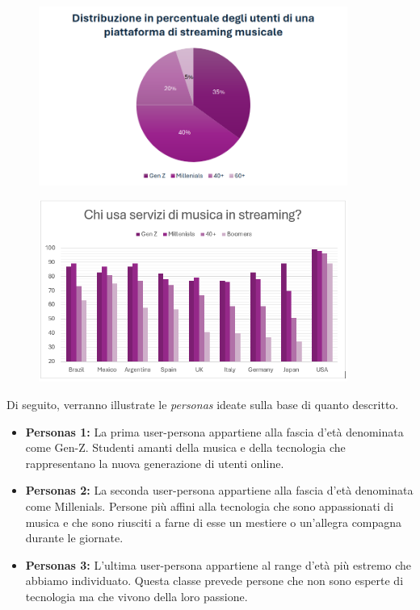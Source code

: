 \documentclass{article}
\begin{document}
			\begin{center}
				\begin{figure}[H]
					\centering
					\includegraphics[width=0.9\textwidth]{Immagini/dati.png}
				\end{figure}
			\end{center}
			\begin{center}
				\begin{figure}[H]
					\centering
					\includegraphics[width=0.9\textwidth]{Immagini/dati2.png}
				\end{figure}
			\end{center}
			Di seguito, verranno illustrate le \textit{personas} ideate sulla base di quanto descritto.
			\begin{itemize}
				\item \textbf{Personas 1:} La prima user-persona appartiene alla fascia d'età denominata come Gen-Z. Studenti amanti della musica e della tecnologia che rappresentano la nuova generazione di utenti online.
				\item \textbf{Personas 2:} La seconda user-persona appartiene alla fascia d'età denominata come Millenials. Persone più affini alla tecnologia che sono appassionati di musica e che sono riusciti a farne di esse un mestiere o un'allegra compagna durante le giornate.
				\item \textbf{Personas 3:} L'ultima user-persona appartiene al range d'età più estremo che abbiamo individuato. Questa classe prevede persone che non sono esperte di tecnologia ma che vivono della loro passione.
			\end{itemize}
			
			
			
				
\end{document}
